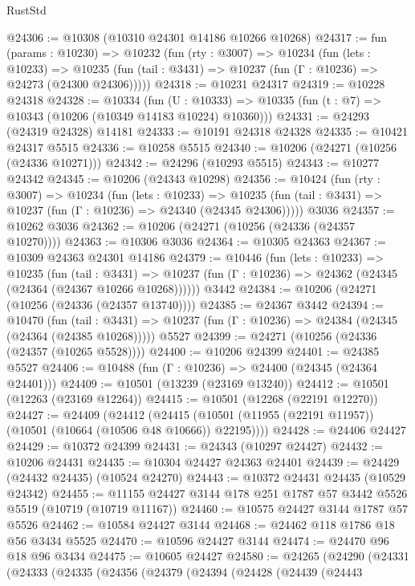 \begin{lexlean}{RustStd}
\begin{coremodule}
@24306 := @10308 (@10310 @24301 @14186 @10266 @10268)
@24317 := fun (params : @10230) =>
  @10232
    (fun (rty : @3007) =>
    @10234
      (fun (lets : @10233) =>
      @10235 (fun (tail : @3431) => @10237 (fun (Γ : @10236) => @24273 (@24300 @24306)))))
@24318 := @10231 @24317
@24319 := @10228 @24318
@24328 := @10334
    (fun (U : @10333) => @10335 (fun (t : @7) => @10343 (@10206 (@10349 @14183 @10224) @10360)))
@24331 := @24293 (@24319 @24328) @14181
@24333 := @10191 @24318 @24328
@24335 := @10421 @24317 @5515
@24336 := @10258 @5515
@24340 := @10206 (@24271 (@10256 (@24336 @10271)))
@24342 := @24296 (@10293 @5515)
@24343 := @10277 @24342
@24345 := @10206 (@24343 @10298)
@24356 := @10424
    (fun (rty : @3007) =>
    @10234
      (fun (lets : @10233) =>
      @10235 (fun (tail : @3431) => @10237 (fun (Γ : @10236) => @24340 (@24345 @24306)))))
    @3036
@24357 := @10262 @3036
@24362 := @10206 (@24271 (@10256 (@24336 (@24357 @10270))))
@24363 := @10306 @3036
@24364 := @10305 @24363
@24367 := @10309 @24363 @24301 @14186
@24379 := @10446
    (fun (lets : @10233) =>
    @10235
      (fun (tail : @3431) =>
      @10237 (fun (Γ : @10236) => @24362 (@24345 (@24364 (@24367 @10266 @10268))))))
    @3442
@24384 := @10206 (@24271 (@10256 (@24336 (@24357 @13740))))
@24385 := @24367 @3442
@24394 := @10470
    (fun (tail : @3431) => @10237 (fun (Γ : @10236) => @24384 (@24345 (@24364 (@24385 @10268)))))
    @5527
@24399 := @24271 (@10256 (@24336 (@24357 (@10265 @5528))))
@24400 := @10206 @24399
@24401 := @24385 @5527
@24406 := @10488 (fun (Γ : @10236) => @24400 (@24345 (@24364 @24401)))
@24409 := @10501 (@13239 (@23169 @13240))
@24412 := @10501 (@12263 (@23169 @12264))
@24415 := @10501 (@12268 (@22191 @12270))
@24427 := @24409
    (@24412 (@24415 (@10501 (@11955 (@22191 @11957)) (@10501 (@10664 (@10506 @48 @10666)) @22195))))
@24428 := @24406 @24427
@24429 := @10372 @24399
@24431 := @24343 (@10297 @24427)
@24432 := @10206 @24431
@24435 := @10304 @24427 @24363 @24401
@24439 := @24429 (@24432 @24435) (@10524 @24270)
@24443 := @10372 @24431 @24435 (@10529 @24342)
@24455 := @11155 @24427 @3144 @178 @251 @1787 @57 @3442 @5526 @5519 (@10719 (@10719 @11167))
@24460 := @10575 @24427 @3144 @1787 @57 @5526
@24462 := @10584 @24427 @3144
@24468 := @24462 @118 @1786 @18 @56 @3434 @5525
@24470 := @10596 @24427 @3144
@24474 := @24470 @96 @18 @96 @3434
@24475 := @10605 @24427
@24580 := @24265
    (@24290
      (@24331
        (@24333
          (@24335
            (@24356
              (@24379
                (@24394
                  (@24428
                    (@24439
                      (@24443

\end{coremodule}
\end{lexlean}

